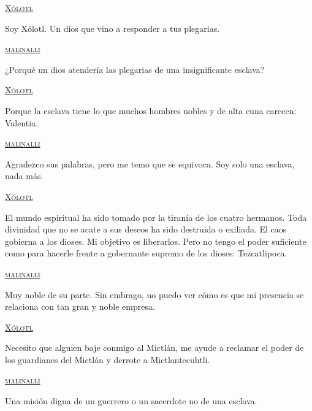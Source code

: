 \documentclass[11pt,letterpaper]{article}
\begin{document}
\begin{center}
	\par
\textsc{\underline{Xólotl}}
\\	
	\par
Soy Xólotl. Un dios que vino a responder a tus plegarias.
\\	
	\par
\textsc{\underline{malinalli}}
\\	
	\par
¿Porqué un dios atendería las plegarias de una insignificante esclava?
\\	
	\par
\textsc{\underline{Xólotl}}
\\	
	\par
Porque la esclava tiene lo que muchos hombres nobles y de alta cuna carecen: Valentia. 
\\	
	\par
\textsc{\underline{malinalli}}
\\	
	\par
Agradezco sus palabras, pero me temo que se equivoca. Soy solo una esclava, nada más.
\\	
	\par
\textsc{\underline{Xólotl}}
\\	
	\par
El mundo espiritual ha sido tomado por la tiranía de los cuatro hermanos. Toda divinidad que no se acate a sus deseos ha sido destruida o exiliada. El caos gobierna a los dioses. Mi objetivo es liberarlos. Pero no tengo el poder suficiente como para hacerle frente a gobernante supremo de los dioses: Tezcatlipoca.
\\	
	\par
\textsc{\underline{malinalli}}
\\	
	\par
Muy noble de su parte. Sin embrago, no puedo ver cómo es que mi presencia se relaciona con tan gran y noble empresa.
\\	
	\par
\textsc{\underline{Xólotl}}
\\	
	\par
Necesito que alguien baje conmigo al Mictlán, me ayude a reclamar el poder de los guardianes del Mictlán y derrote a Mictlantecuhtli.
\\	
	\par
\textsc{\underline{malinalli}}
\\	
	\par
Una misión digna de un guerrero o un sacerdote no de una esclava.
\\	

\end{center}
\end{document}
